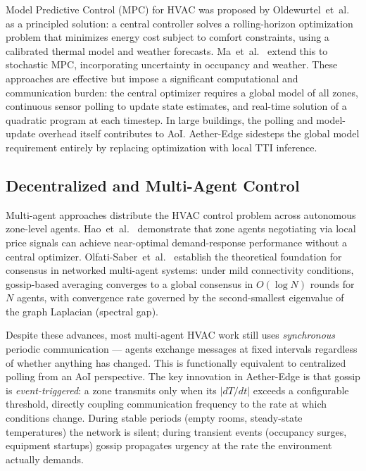 \documentclass[conference]{IEEEtran}
\begin{document}
Model Predictive Control (MPC) for HVAC was proposed by Oldewurtel~et~al.
\cite{oldewurtel2012} as a principled solution: a central controller solves a
rolling-horizon optimization problem that minimizes energy cost subject to
comfort constraints, using a calibrated thermal model and weather forecasts.
Ma~et~al.~\cite{ma2012} extend this to stochastic MPC, incorporating
uncertainty in occupancy and weather.  These approaches are effective but
impose a significant computational and communication burden: the central
optimizer requires a global model of all zones, continuous sensor polling to
update state estimates, and real-time solution of a quadratic program at each
timestep.  In large buildings, the polling and model-update overhead itself
contributes to AoI.  Aether-Edge sidesteps the global model requirement
entirely by replacing optimization with local TTI inference.

\subsection{Decentralized and Multi-Agent Control}

Multi-agent approaches distribute the HVAC control problem across autonomous
zone-level agents.  Hao~et~al.~\cite{hao2012} demonstrate that zone agents
negotiating via local price signals can achieve near-optimal demand-response
performance without a central optimizer.  Olfati-Saber~et~al.~\cite{olfati2007}
establish the theoretical foundation for consensus in networked multi-agent
systems: under mild connectivity conditions, gossip-based averaging converges
to a global consensus in $O(\log N)$ rounds for $N$ agents, with convergence
rate governed by the second-smallest eigenvalue of the graph Laplacian
(spectral gap).

Despite these advances, most multi-agent HVAC work still uses
\emph{synchronous} periodic communication --- agents exchange messages at
fixed intervals regardless of whether anything has changed.  This is
functionally equivalent to centralized polling from an AoI perspective.  The
key innovation in Aether-Edge is that gossip is \emph{event-triggered}: a
zone transmits only when its $|dT/dt|$ exceeds a configurable threshold,
directly coupling communication frequency to the rate at which conditions
change.  During stable periods (empty rooms, steady-state temperatures) the
network is silent; during transient events (occupancy surges, equipment
startups) gossip propagates urgency at the rate the environment actually
demands.
\end{document}
